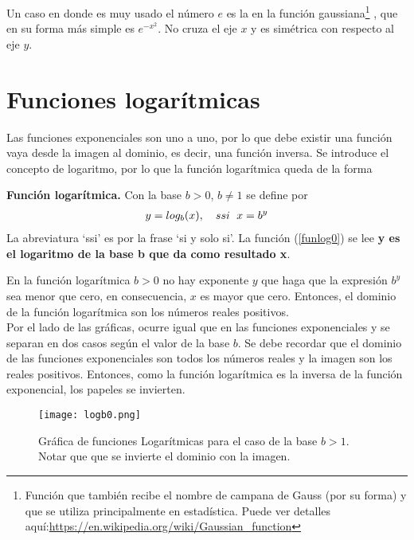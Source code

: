 Un caso en donde es muy usado el número $e$ es la en la función gaussiana\footnote{Función que también recibe el nombre de campana de Gauss (por su forma) y que se utiliza principalmente en estadística. Puede ver detalles aquí:\url{https://en.wikipedia.org/wiki/Gaussian_function} }  , que en su forma más simple es $e^{-x^2}$. No cruza el eje $x$ y es simétrica  con respecto al eje $y$.
\section{Funciones logarítmicas}

Las funciones exponenciales son uno a uno, por lo que debe existir una función vaya desde la imagen al dominio, es decir, una función inversa. Se introduce el concepto de logaritmo, por lo que la función logarítmica queda de la forma
\begin{mydef}
\textbf{Función logarítmica. } Con la base $b>0$, $b\neq 1$ se define por
\begin{eqnarray}
y=log_{b}(x), \hspace{10px} ssi \hspace{6px} x=b^{y}
\label{funlog0}
\end{eqnarray}
La abreviatura `ssi' es por la frase `si y solo si'. La función (\ref{funlog0})  se lee \textbf{y es el logaritmo de la base b que da como resultado x}.
\end{mydef}

En la función logarítmica $b>0$ no hay exponente $y$ que haga que la expresión $b^{y}$ sea menor que cero, en consecuencia, $x$ es mayor que cero. Entonces, el dominio de la función logarítmica son los números reales positivos.\\

Por el lado de las gráficas, ocurre igual que en las funciones exponenciales y se separan en dos casos según el valor de la base $b$. Se debe recordar que el dominio de las funciones exponenciales son todos los números reales y la imagen son los reales positivos. Entonces, como la función logarítmica es la inversa  de la función exponencial, los papeles se invierten.

 \begin{center}
\begin{figure}[h!]
\centering
\texttt{[image: logb0.png]}
\caption[Gráfica de funciones logarítmicas para el caso de la base $b>1$]{Gráfica de funciones Logarítmicas para el caso de la base $b>1$. Notar que que se invierte el dominio con la imagen.} \label{logb0}
\end{figure}
\end{center}

